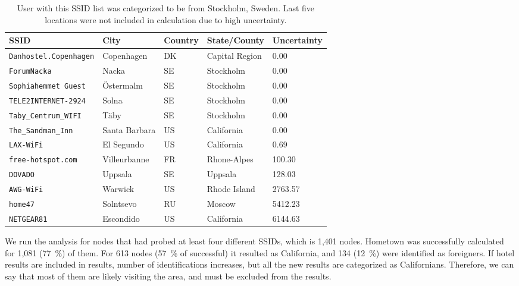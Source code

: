 \documentclass[12pt,a4paper,oneside,pdftex]{report}
\begin{document}
\begin{table}
\center
    \begin{tabular}{| *{5}{l} |}
\hline
\textbf{SSID} & \textbf{City} & \textbf{Country} & \textbf{State/County} & \textbf{Uncertainty}  \\ \hline
\texttt{Danhostel.Copenhagen} & Copenhagen    & DK      & Capital Region & 0.00 \\ 
\hline
\texttt{ForumNacka}           & Nacka         & SE      & Stockholm      & 0.00 \\ 
\hline
\texttt{Sophiahemmet Guest}   & \"{O}stermalm     & SE      & Stockholm      & 0.00 \\ 
\hline
\texttt{TELE2INTERNET-2924}   & Solna         & SE      & Stockholm      & 0.00 \\ 
\hline
\texttt{Taby\_Centrum\_WIFI}  & T\"{a}by          & SE      & Stockholm      & 0.00 \\ 
\hline
\texttt{The\_Sandman\_Inn}    & Santa Barbara & US      & California     & 0.00 \\ 
\hline
\texttt{LAX-WiFi}             & El Segundo    & US      & California     & 0.69 \\ 
\hline
\texttt{free-hotspot.com}     & Villeurbanne  & FR      & Rhone-Alpes    & 100.30 \\ 
\hline
\texttt{DOVADO}               & Uppsala       & SE      & Uppsala        & 128.03 \\ 
\hline
\texttt{AWG-WiFi}             & Warwick       & US      & Rhode Island   & 2763.57 \\ 
\hline
\texttt{home47}               & Solntsevo     & RU      & Moscow         & 5412.23 \\ 
\hline
\texttt{NETGEAR81}            & Escondido     & US      & California     & 6144.63 \\ 
\hline
    \end{tabular}
    \caption{User with this SSID list was categorized to be from Stockholm, Sweden. Last five locations were not included in calculation due to high uncertainty.}
    \label{tab:example_hometown}
\end{table}

We run the analysis for nodes that had probed at least four different SSIDs, which is 1,401 nodes. Hometown was successfully calculated for 1,081 (77~\%) of them. For 613 nodes (57~\% of successful) it resulted as California, and 134 (12~\%) were identified as foreigners. If hotel results are included in results, number of identifications increases, but all the new results are categorized as Californians. Therefore, we can say that most of them are likely visiting the area, and must be excluded from the results.
\end{document}
